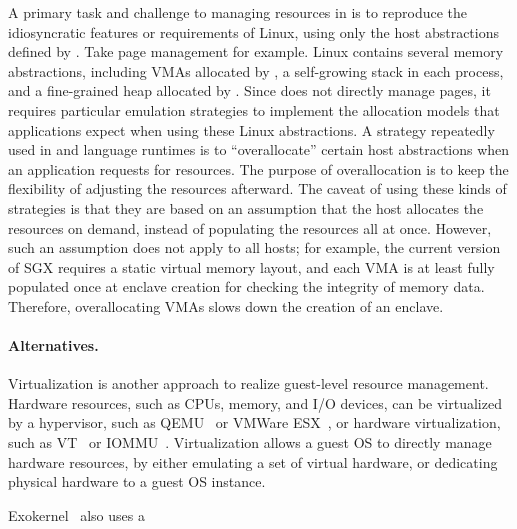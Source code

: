 A primary task and challenge to managing resources in \thelibos{}
is to reproduce the idiosyncratic %
features or requirements of Linux, %
using only the host abstractions
defined by \thehostabi{}.
Take page management for example.
Linux contains several memory abstractions, including VMAs allocated by , a self-growing stack in each process, and a fine-grained heap allocated by .
Since \thelibos{} does not directly manage pages,
it requires particular emulation strategies to
implement the allocation models that applications expect when using these Linux abstractions.
A strategy repeatedly used in \thelibos{} and language runtimes
is to ``overallocate'' certain host abstractions when an application requests for resources.
The purpose of overallocation is
to keep the flexibility of adjusting the resources afterward.
The caveat of using these kinds of strategies
is that they are based on an assumption that the host
allocates the resources
on demand, instead of populating the resources all at once.
However, such an assumption does not apply to all hosts;
for example, the current version of SGX requires a static virtual memory layout,
and each VMA is at least fully populated once at enclave creation
for checking the integrity of memory data.
Therefore, overallocating VMAs slows down the creation of an enclave.












\paragraph{Alternatives.}
Virtualization is another approach to realize guest-level resource management.
Hardware resources, such as CPUs, memory, and I/O devices,
can be virtualized by a hypervisor, such as QEMU~\cite{qemu} or VMWare ESX~\cite{wldspurger02vmware-esx},
or hardware virtualization, such as VT~\cite{VT} or IOMMU~\cite{VT-d}.
Virtualization allows a guest OS to directly manage hardware resources, by either emulating a set of virtual hardware,
or dedicating physical hardware to a guest OS instance.






Exokernel~\cite{engler95exokernel} also uses a \libos{}













